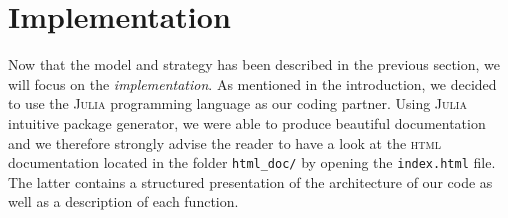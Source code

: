 \section{Implementation} %
\label{sec:implementation}
Now that the model and strategy has been described in the previous
section, we will focus on the \emph{implementation}.
As mentioned in the introduction, we decided to use the \textsc{Julia}
programming language as our coding partner.
Using \textsc{Julia} intuitive package generator, we were able to
produce beautiful documentation and we therefore strongly advise
the reader to have a look at the \textsc{html} documentation located
in the folder \lstinline|html_doc/| by opening the \texttt{index.html} file.
The latter contains a structured presentation of the architecture
of our code as well as a description of each function.





